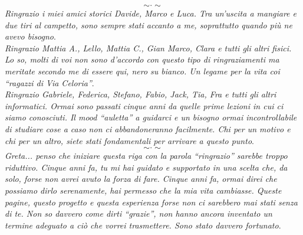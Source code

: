 \begin{flushleft}
  \[\sim\cdot\sim\]
  \textit{Ringrazio i miei amici storici Davide, Marco e Luca. Tra un'uscita a
    mangiare e due tiri al campetto, sono sempre stati accanto a me, soprattutto
    quando più ne avevo bisogno}.\\
  \vspace{2mm}
  \textit{Ringrazio Mattia A., Lello, Mattia C., Gian Marco, Clara e tutti gli
    altri fisici. Lo so, molti di voi non sono d'accordo con questo tipo di
    ringraziamenti ma meritate secondo me di essere qui, nero su bianco. Un
    legame per la vita coi ``ragazzi di Via Celoria''}.\\
  \vspace{2mm}
  \textit{Ringrazio Gabriele, Federica, Stefano, Fabio, Jack, Tia, Fra e tutti
    gli altri informatici. Ormai sono passati cinque anni da quelle prime
    lezioni in cui ci siamo conosciuti. Il mood ``auletta'' a guidarci e un
    bisogno ormai incontrollabile di studiare cose a caso non ci abbandoneranno
    facilmente. Chi per un motivo e chi per un altro, siete stati fondamentali
    per arrivare a questo punto}.
  \[\sim\cdot\sim\]
  \textit{Greta... penso che iniziare questa riga con la parola ``ringrazio''
    sarebbe troppo riduttivo. Cinque anni fa, tu mi hai guidato e supportato in
    una scelta che, da solo, forse non avrei avuto la forza di fare. Cinque
    anni fa, ormai direi che possiamo dirlo serenamente, hai permesso che la mia
    vita cambiasse. Queste pagine, questo progetto e questa esperienza forse non
    ci sarebbero mai stati senza di te. Non so davvero come dirti ``grazie'',
    non hanno ancora inventato un termine adeguato a ciò che vorrei
    trasmettere. Sono stato davvero fortunato}.
\end{flushleft}